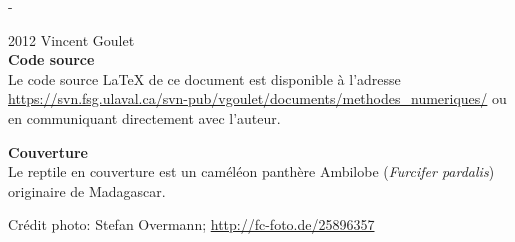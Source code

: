 \begingroup
\calccentering{\unitlength}
\begin{adjustwidth*}{\unitlength}{-\unitlength}
  \setlength{\parindent}{0pt}
  \setlength{\parskip}{\baselineskip}

  {\textcopyright} 2012 Vincent Goulet \\

  

  \textbf{Code source} \\
  Le code source {\LaTeX} de ce document est disponible à l'adresse
    \url{https://svn.fsg.ulaval.ca/svn-pub/vgoulet/documents/methodes_numeriques/}
  ou en communiquant directement avec l'auteur.

  \textbf{Couverture} \\
  Le reptile en couverture est un caméléon panthère Ambilobe
  (\emph{Furcifer pardalis}) originaire de Madagascar.

  Crédit photo: Stefan Overmann; \url{http://fc-foto.de/25896357}
\end{adjustwidth*}
\endgroup

